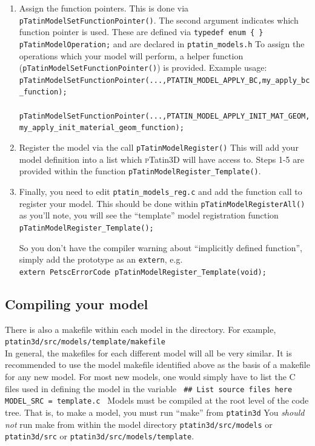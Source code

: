 \documentclass[paper=a4, fontsize=11pt,twoside]{scrartcl}
\newcommand{\ptat}{{{\textsc pTatin3D}}}
\newcommand{\shellcmd}[1]{\\\indent\indent\texttt{\hspace{5mm}\footnotesize #1}\\}
\newcommand{\unix}[1]{\texttt{\footnotesize #1}}
\begin{document}
{{\begin{enumerate}
	\item Assign the function pointers. This is done via \unix{pTatinModelSetFunctionPointer()}.
The second argument indicates which function pointer is used. These are defined via
\unix{typedef enum \{ \} pTatinModelOperation;}
and are declared in 
\unix{ptatin\_models.h}
To assign the operations which your model will perform, a helper function (\unix{pTatinModelSetFunctionPointer()}) is provided.
Example usage:
\shellcmd{pTatinModelSetFunctionPointer(...,PTATIN\_MODEL\_APPLY\_BC,my\_apply\_bc\_function);}
\shellcmd{pTatinModelSetFunctionPointer(...,PTATIN\_MODEL\_APPLY\_INIT\_MAT\_GEOM,my\_apply\_init\_material\_geom\_function);} %

	\item Register the model via the call
\unix{pTatinModelRegister()}
This will add your model definition into a list which {\ptat} will have access to.
Steps 1-5 are provided within the function \unix{pTatinModelRegister\_Template()}.

	\item Finally, you need to edit
	\unix{ptatin\_models\_reg.c}
and add the function call to register your model.
This should be done within
		\unix{pTatinModelRegisterAll()}
as you'll note, you will see the ``template'' model registration function 	
		\unix{pTatinModelRegister\_Template();}

So you don't have the compiler warning about ``implicitly defined function'', simply add the prototype as an \unix{extern}, e.g.
	\shellcmd{extern PetscErrorCode pTatinModelRegister\_Template(void);}
\end{enumerate}

\subsection{Compiling your model}
There is also a makefile within each model in the directory.
For example,
	\shellcmd{ptatin3d/src/models/template/makefile}
In general, the makefiles for each different model will all be very similar.
It is recommended to use the model makefile identified above as the basis of a makefile for any new model.
For most new models, one would simply have to list the C files used in defining the model in the variable
\newline
\unix{
\#\# List source files here \newline
MODEL\_SRC = \newline
        template.c \newline
}
Models must be compiled at the root level of the code tree.
That is, to make a model, you must run ``make'' from 
	\unix{ptatin3d}
You \textit{should not} run make from within the model directory
	\unix{ptatin3d/src/models}
or
	\unix{ptatin3d/src}
or
	\unix{ptatin3d/src/models/template}.

}}
\end{document}
